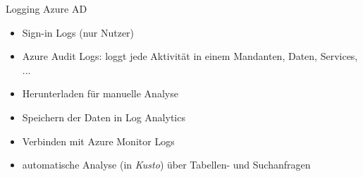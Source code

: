 \begin{flashcard}[Definition]{Logging Azure AD}
  \begin{itemize}
    \item Sign-in Logs (nur Nutzer)
    \item Azure Audit Logs: \newline
      loggt jede Aktivität in einem Mandanten, Daten, Services, ...
    \item Herunterladen für manuelle Analyse
    \item Speichern der Daten in Log Analytics
    \item Verbinden mit Azure Monitor Logs
    \item automatische Analyse (in \emph{Kusto}) über Tabellen- und Suchanfragen
  \end{itemize}
\end{flashcard}
